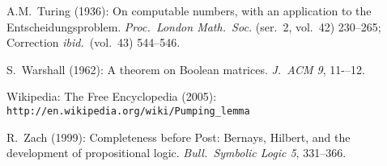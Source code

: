 \begin{thebibliography}{999}
A.M.~Turing (1936): On computable numbers, with an application to the
Entscheidungsproblem.  {\it Proc.~London Math.~Soc.} (ser.~2, vol.~42)
230--265; Correction {\it ibid.}~(vol.~43) 544--546.


S.~Warshall (1962): A theorem on Boolean matrices.  {\it J.~ACM 9},
11-–12.


Wikipedia: The Free Encyclopedia (2005): \\
{\tt http://en.wikipedia.org/wiki/Pumping\_lemma}


R.~Zach (1999): Completeness before Post: Bernays, Hilbert, and the
development of propositional logic.  {\it Bull.~Symbolic Logic 5},
331--366.

\end{thebibliography}

